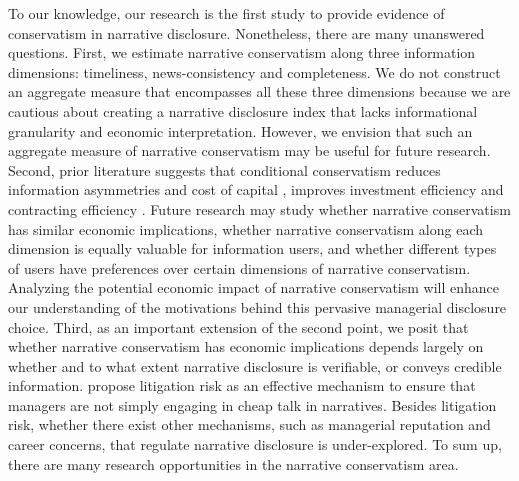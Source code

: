 \documentclass[letterpaper,12pt]{article}
\begin{document}
\begin{spacing}{1.5}
To our knowledge, our research is the first study to provide evidence of conservatism in narrative disclosure. Nonetheless, there are many unanswered questions. First, we estimate narrative conservatism along three information dimensions: timeliness, news-consistency and completeness. We do not construct an aggregate measure that encompasses all these three dimensions because we are cautious about creating a narrative disclosure index that lacks informational granularity and economic interpretation. However, we envision that such an aggregate measure of narrative conservatism may be useful for future research. Second, prior literature suggests that conditional conservatism reduces information asymmetries \cite{garcialaraInformationConsequencesAccounting2014} and cost of capital \cite{suijsValueRelevanceAsymmetric2008, garcialaraConditionalConservatismCost2011, guayConservativeDisclosure2018}, improves investment efficiency \cite{francisAcquisitionProfitabilityTimely2010, bushmanCapitalAllocationTimely2011, garcialaraAccountingConservatismFirm2016} and contracting efficiency \cite{wattsConservatismAccountingPart2003, zhangContractingBenefitsAccounting2008}. Future research may study whether narrative conservatism has similar economic implications, whether narrative conservatism along each dimension is equally valuable for information users, and whether different types of users have preferences over certain dimensions of narrative conservatism. Analyzing the potential economic impact of narrative conservatism will enhance our understanding of the motivations behind this pervasive managerial disclosure choice. Third, as an important extension of the second point, we posit that whether narrative conservatism has economic implications depends largely on whether and to what extent narrative disclosure is verifiable, or conveys credible information.  propose litigation risk as an effective mechanism to ensure that managers are not simply engaging in cheap talk in narratives. Besides litigation risk, whether there exist other mechanisms, such as managerial reputation and career concerns, that regulate narrative disclosure is under-explored. To sum up, there are many research opportunities in the narrative conservatism area.

\end{spacing}

\newpage



\newpage


\newpage


\newpage


\newpage
\setcounter{page}{1}

\end{document}
